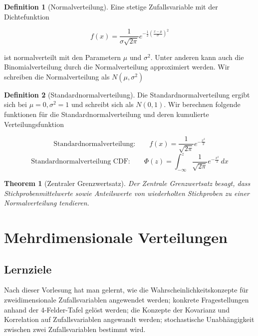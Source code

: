 \documentclass{article}
\newtheorem{theorem}{Theorem}
\theoremstyle{definition}
\newtheorem{definition}{Definition}
\theoremstyle{exercise}
\theoremstyle{solution}
\theoremstyle{lemma}
\begin{document}
\begin{definition}[Normalverteilung]
Eine stetige Zufallsvariable mit der Dichtefunktion

\[ f(x)=\frac{1}{\sigma \sqrt{2\pi}}e^{-\frac{1}{2}\left(\frac{x-\mu}{\sigma}\right)^2} \]

ist normalverteilt mit den Parametern $\mu$ und $\sigma^2$. Unter anderen kann auch die Binomialverteilung durch die Normalverteilung approximiert werden. Wir schreiben die Normalverteilung als $N(\mu,\sigma^2)$
\end{definition}

\begin{definition}[Standardnormalverteilung]
Die Standardnormalverteilung ergibt sich bei $\mu=0, \sigma^2=1$ und schreibt sich als $N(0,1)$. Wir berechnen folgende funktionen für die Standardnormalverteilung und deren kumulierte Verteilungsfunktion

\[ \text{Standardnormalverteilung:} \qquad f(x)=\frac{1}{\sqrt{2\pi}}e^{-\frac{x^2}{2}} \]
\[ \text{Standardnormalverteilung CDF:} \qquad \Phi(z)=\int_{-\infty}^{z}\frac{1}{\sqrt{2\pi}}e^{-\frac{x^2}{2}} \, dx\]

\end{definition}

\begin{theorem}[Zentraler Grenzwertsatz]
Der Zentrale Grenzwertsatz besagt, dass Stichprobenmittelwerte sowie Anteilswerte von wiederholten Stichproben zu einer Normalverteilung tendieren.
\end{theorem}


\section{Mehrdimensionale Verteilungen}
\subsection{Lernziele}
Nach dieser Vorlesung hat man gelernt, wie die Wahrscheinlichkeitskonzepte für zweidimensionale Zufallsvariablen angewendet werden; konkrete Fragestellungen anhand der 4-Felder-Tafel gelöst werden; die Konzepte der Kovarianz und Korrelation auf Zufallsvariablen angewandt werden; stochastische Unabhängigkeit zwischen zwei Zufallsvariablen bestimmt wird. 

\vspace{1em}
\end{document}
